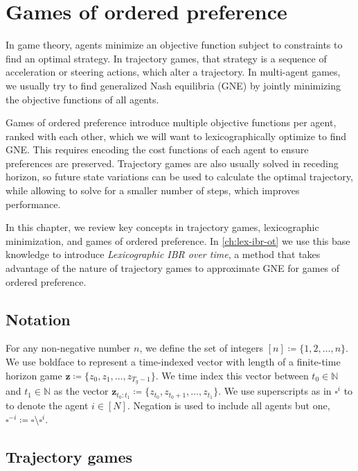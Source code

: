 \chapter{Games of ordered preference}
\label{ch:goop}

In game theory, agents minimize an objective function subject to constraints to find an optimal
strategy. In trajectory games, that strategy is a sequence of acceleration
or steering actions, which alter a trajectory. In multi-agent games,
we usually try to find generalized Nash equilibria (GNE) by jointly minimizing the
objective functions of all agents.

Games of ordered preference introduce multiple objective functions per agent,
ranked with each other, which we will want to lexicographically optimize to
find GNE. This requires encoding the cost functions of each agent to ensure
preferences are preserved.
Trajectory games are also usually solved in receding horizon, so future state
variations can be used to calculate the optimal trajectory, while allowing to
solve for a smaller number of steps, which improves performance.

In this chapter, we review key concepts
in trajectory games, lexicographic minimization,
and games of ordered preference. In \cref{ch:lex-ibr-ot} we use this
base knowledge to introduce \emph{Lexicographic IBR over time}, a method that
takes advantage of the nature of trajectory games to approximate GNE for
games of ordered preference.

\section{Notation}

For any non-negative number \(n\), we define the set
of integers \([n] \coloneq \{1, 2, \dots, n\}\).
We use boldface to represent a time-indexed vector with length
of a finite-time horizon game \(\mathbf{z} \coloneq \{z_0, z_1, \dots, z_{T_g-1}\}\).
We time index this vector between \(t_0 \in \mathbb{N}\) and \(t_1 \in \mathbb{N}\)
as the vector \(\mathbf{z}_{t_0:t_1} \coloneq \{z_{t_0}, z_{t_0+1}, \dots, z_{t_1}\}\).
We use superscripts as in \(\square^i\) to to denote the agent \(i\in[N]\).
Negation is used to include all agents but one,
\(\square^{-i} \coloneq \square \setminus \square^i\).

\section{Trajectory games}
\label{sec:trajgames}

